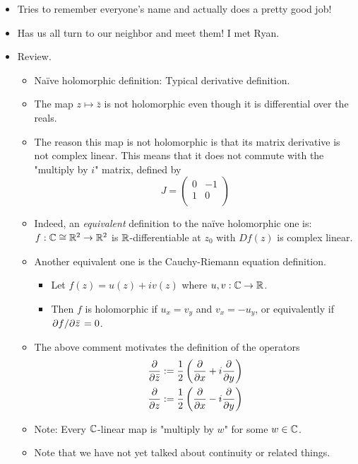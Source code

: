 \documentclass[../notes.tex]{subfiles}
\begin{document}
\begin{itemize}
    \item {}Tries to remember everyone's name and actually does a pretty good job!
    \item Has us all turn to our neighbor and meet them! I met Ryan.
    \item Review.
    \begin{itemize}
        \item Na\"{i}ve holomorphic definition: Typical derivative definition.
        \item The map $z\mapsto\bar{z}$ is not holomorphic even though it is differential over the reals.
        \item The reason this map is not holomorphic is that its matrix derivative is not complex linear. This means that it does not commute with the "multiply by $i$" matrix, defined by
        \begin{equation*}
            J =
            \begin{pmatrix}
                0 & -1\\
                1 & 0\\
            \end{pmatrix}
        \end{equation*}
        \item Indeed, an \emph{equivalent} definition to the na\"{i}ve holomorphic one is: $f:\mathbb{C}\cong\mathbb{R}^2\to\mathbb{R}^2$ is $\mathbb{R}$-differentiable at $z_0$ with $Df(z)$ is complex linear.
        \item Another equivalent one is the Cauchy-Riemann equation definition.
        \begin{itemize}
            \item Let $f(z)=u(z)+iv(z)$ where $u,v:\mathbb{C}\to\mathbb{R}$.
            \item Then $f$ is holomorphic if $u_x=v_y$ and $v_x=-u_y$, or equivalently if $\pdv*{f}{\bar{z}}=0$.
        \end{itemize}
        \item The above comment motivates the definition of the operators
        \begin{align*}
            \pdv{\bar{z}} &:= \frac{1}{2}\left( \pdv{x}+i\pdv{y} \right)\\
            \pdv{z} &:= \frac{1}{2}\left( \pdv{x}-i\pdv{y} \right)
        \end{align*}
        \item Note: Every $\mathbb{C}$-linear map is "multiply by $w$" for some $w\in\mathbb{C}$.
        \item Note that we have not yet talked about continuity or related things.

\end{itemize}
\end{itemize}
\end{document}
